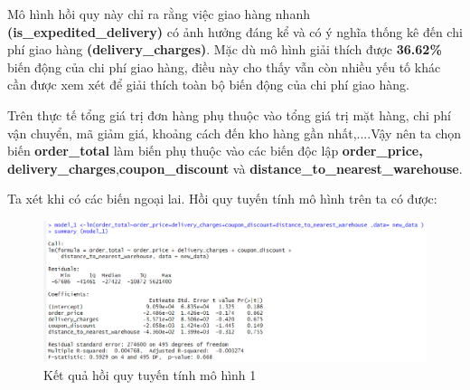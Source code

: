 Mô hình hồi quy này chỉ ra rằng việc giao hàng nhanh \textbf{(is\_expedited\_delivery)} có ảnh hưởng đáng kể và có ý nghĩa thống kê đến chi phí giao hàng \textbf{(delivery\_charges)}. Mặc dù mô hình giải thích được \textbf{36.62\%} biến động của chi phí giao hàng, điều này cho thấy vẫn còn nhiều yếu tố khác cần được xem xét để giải thích toàn bộ biến động của chi phí giao hàng.

Trên thực tế tổng giá trị đơn hàng phụ thuộc vào tổng giá trị mặt hàng, chi phí vận chuyển, mã giảm giá, khoảng cách đến kho hàng gần nhất,....Vậy nên ta chọn biến \textbf{order\_total} làm biến phụ thuộc vào các biến độc lập \textbf{order\_price, delivery\_charges},\textbf{coupon\_discount} và \textbf{distance\_to\_nearest\_warehouse}.

Ta xét khi có các biến ngoại lai. Hồi quy tuyến tính mô hình trên ta có được:
\begin{figure}[!htp]
  \centering
  \includegraphics[width=0.7\linewidth]{graphics/5.5.2.png}
  \caption{Kết quả hồi quy tuyến tính mô hình 1 }
\end{figure}

